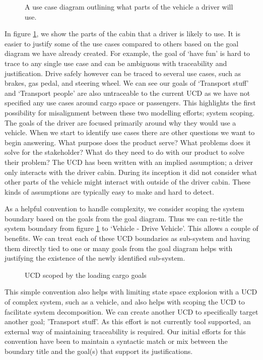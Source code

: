 \begin{figure}
	\centering
	
	\caption{A use case diagram outlining what parts of the vehicle a driver will use.}
	\label{fig:Driver_UCD}
\end{figure} 

In figure \ref{fig:Driver_UCD}, we show the parts of the cabin that a driver is likely to use. It is easier to justify some of the use cases compared to others based on the goal diagram we have already created. For example, the goal of `have fun' is hard to trace to any single use case and can be ambiguous with traceability and justification. Drive safely however can be traced to several use cases, such as brakes, gas pedal, and steering wheel. We can see our goals of `Transport stuff' and `Transport people' are also untraceable to the current \ac{UCD} as we have not specified any use cases around cargo space or passengers. This highlights the first possibility for misalignment between these two modelling efforts; system scoping. The goals of the driver are focused primarily around why they would use a vehicle. When we start to identify use cases there are other questions we want to begin answering. What purpose does the product serve? What problems does it solve for the stakeholder? What do they need to do with our product to solve their problem? The \ac{UCD} has been written with an implied assumption; a driver only interacts with the driver cabin. During its inception it did not consider what other parts of the vehicle might interact with outside of the driver cabin. These kinds of assumptions are typically easy to make and hard to detect. 

As a helpful convention to handle complexity, we consider scoping the system boundary based on the goals from the goal diagram. Thus we can re-title the system boundary from figure \ref{fig:Driver_UCD} to `Vehicle - Drive Vehicle'. This allows a couple of benefits. We can treat each of these \ac{UCD} boundaries as sub-system and having them directly tied to one or many goals from the goal diagram helps with justifying the existence of the newly identified sub-system.

\begin{figure}
	\centering
	
	\caption{\ac{UCD} scoped by the loading cargo goals}
	\label{fig:Cargo_UCD}
\end{figure}

This simple convention also helps with limiting state space explosion with a \ac{UCD} of complex system, such as a vehicle, and also helps with scoping the \ac{UCD} to facilitate system decomposition. We can create another \ac{UCD} to specifically target another goal; 'Transport stuff'. As this effort is not currently tool supported, an external way of maintaining traceability is required. Our initial efforts for this convention have been to maintain a syntactic match or mix between the boundary title and the goal(s) that support its justifications.

